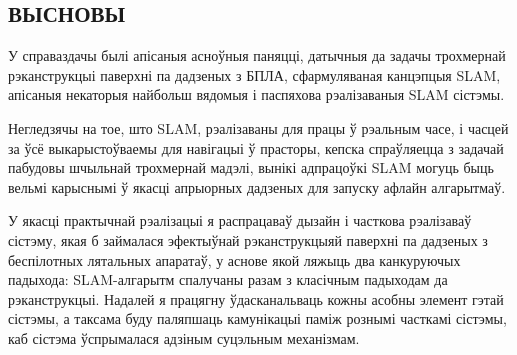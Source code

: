 \begin{center}
    \section*{ВЫСНОВЫ}
\end{center}

У справаздачы былі апісаныя асноўныя паняцці, датычныя да задачы трохмернай рэканструкцыі
паверхні па дадзеных з БПЛА, сфармуляваная канцэпцыя SLAM, апісаныя некаторыя
найбольш вядомыя і паспяхова рэалізаваныя SLAM сістэмы.

Негледзячы на тое, што SLAM, рэалізаваны для працы ў рэальным часе, і часцей за ўсё выкарыстоўваемы
для навігацыі ў прасторы, кепска спраўляецца з задачай пабудовы шчыльнай трохмернай
мадэлі, вынікі адпрацоўкі SLAM могуць быць вельмі карыснымі ў якасці апрыорных
дадзеных для запуску афлайн алгарытмаў.

У якасці практычнай рэалізацыі я распрацаваў дызайн і часткова рэалізаваў сістэму, якая б
займалася эфектыўнай рэканструкцыяй паверхні па дадзеных з беспілотных лятальных апаратаў, у аснове якой ляжыць
два канкуруючых падыхода: SLAM-алгарытм спалучаны разам з класічным падыходам да
рэканструкцыі. Надалей я працягну ўдасканальваць кожны асобны элемент гэтай сістэмы,
а таксама буду паляпшаць камунікацыі паміж рознымі часткамі сістэмы, каб сістэма
ўспрымалася адзіным суцэльным механізмам.

\newpage
